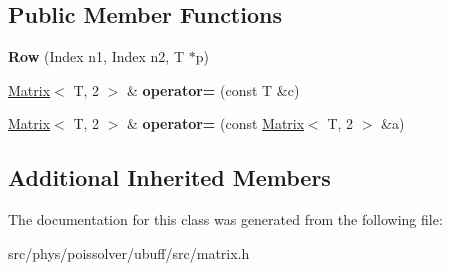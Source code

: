 \subsection*{Public Member Functions}
\begin{DoxyCompactItemize}
\item 
{\bfseries Row} (Index n1, Index n2, T $\ast$p)\hypertarget{classcpt_1_1Row_3_01T_00_012_01_4_a3555df7cb7e214effec7b948b71f238d}{}\label{classcpt_1_1Row_3_01T_00_012_01_4_a3555df7cb7e214effec7b948b71f238d}

\item 
\hyperlink{classcpt_1_1Matrix}{Matrix}$<$ T, 2 $>$ \& {\bfseries operator=} (const T \&c)\hypertarget{classcpt_1_1Row_3_01T_00_012_01_4_a1a58ae3cf12a176e34dd5d49bb59257f}{}\label{classcpt_1_1Row_3_01T_00_012_01_4_a1a58ae3cf12a176e34dd5d49bb59257f}

\item 
\hyperlink{classcpt_1_1Matrix}{Matrix}$<$ T, 2 $>$ \& {\bfseries operator=} (const \hyperlink{classcpt_1_1Matrix}{Matrix}$<$ T, 2 $>$ \&a)\hypertarget{classcpt_1_1Row_3_01T_00_012_01_4_a9cb5897897a3947eae33a4327b2acb65}{}\label{classcpt_1_1Row_3_01T_00_012_01_4_a9cb5897897a3947eae33a4327b2acb65}

\end{DoxyCompactItemize}
\subsection*{Additional Inherited Members}


The documentation for this class was generated from the following file\+:\begin{DoxyCompactItemize}
\item 
src/phys/poissolver/ubuff/src/matrix.\+h\end{DoxyCompactItemize}
